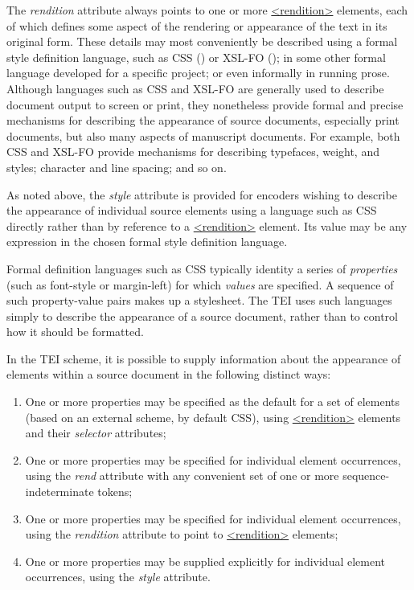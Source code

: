 The {\itshape rendition} attribute always points to one or more \hyperref[TEI.rendition]{<rendition>} elements, each of which defines some aspect of the rendering or appearance of the text in its original form. These details may most conveniently be described using a formal style definition language, such as CSS (\cite{CSS1}) or XSL-FO (\cite{XSL11}); in some other formal language developed for a specific project; or even informally in running prose. Although languages such as CSS and XSL-FO are generally used to describe document output to screen or print, they nonetheless provide formal and precise mechanisms for describing the appearance of source documents, especially print documents, but also many aspects of manuscript documents. For example, both CSS and XSL-FO provide mechanisms for describing typefaces, weight, and styles; character and line spacing; and so on.\par
As noted above, the {\itshape style} attribute is provided for encoders wishing to describe the appearance of individual source elements using a language such as CSS directly rather than by reference to a \hyperref[TEI.rendition]{<rendition>} element. Its value may be any expression in the chosen formal style definition language.\par
Formal definition languages such as CSS typically identity a series of \textit{properties} (such as font-style or margin-left) for which \textit{values} are specified. A sequence of such property-value pairs makes up a stylesheet. The TEI uses such languages simply to describe the appearance of a source document, rather than to control how it should be formatted.\par
In the TEI scheme, it is possible to supply information about the appearance of elements within a source document in the following distinct ways: \begin{enumerate}
\item One or more properties may be specified as the default for a set of elements (based on an external scheme, by default CSS), using \hyperref[TEI.rendition]{<rendition>} elements and their {\itshape selector} attributes;
\item One or more properties may be specified for individual element occurrences, using the {\itshape rend} attribute with any convenient set of one or more sequence-indeterminate tokens;
\item One or more properties may be specified for individual element occurrences, using the {\itshape rendition} attribute to point to \hyperref[TEI.rendition]{<rendition>} elements;
\item One or more properties may be supplied explicitly for individual element occurrences, using the {\itshape style} attribute.
\end{enumerate}\par
